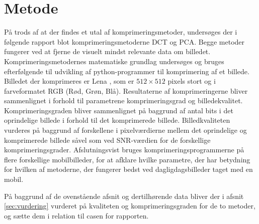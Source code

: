 \section*{Metode}
På trods af at der findes et utal af komprimeringsmetoder, undersøges der i følgende rapport blot komprimeringsmetoderne DCT og PCA. Begge metoder fungerer ved at fjerne de visuelt mindst relevante data om billedet. Komprimeringsmetodernes matematiske grundlag undersøges og bruges efterfølgende til udvikling af python-programmer til komprimering af et billede. Billedet der komprimeres er Lena \citep{lena}, som er $512 \times 512$ pixels stort og i farveformatet RGB (Rød, Grøn, Blå). Resultaterne af komprimeringerne bliver sammenlignet i forhold til parametrene komprimeringsgrad og billedekvalitet. Komprimeringsgraden bliver sammenlignet på baggrund af antal bits i det oprindelige billede i forhold til det komprimerede billede. Billedkvaliteten vurderes på baggrund af forskellene i pixelværdierne mellem det oprindelige og komprimerede billede såvel som ved SNR-værdien for de forskellige komprimeringsgrader. Afslutningsvist bruges komprimeringsprogrammerne på flere forskellige mobilbilleder, for at afklare hvilke parametre, der har betydning for hvilken af metoderne, der fungerer bedst ved dagligdagsbilleder taget med en mobil.

På baggrund af de ovenstående afsnit og dertilhørende data bliver der i afsnit \ref{sec:vurdering} vurderet på kvaliteten og komprimeringsgraden for de to metoder, og sætte dem i relation til casen for rapporten.